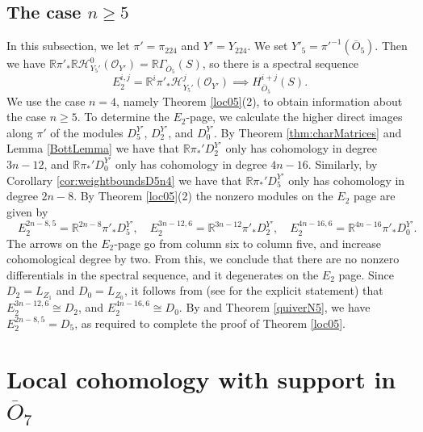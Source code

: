 \documentclass[11pt,reqno]{amsart}
\newcommand{\mc}[1]{\mathcal{#1}}
\newcommand{\ol}[1]{\overline{#1}}
\numberwithin{equation}{section}
\begin{document}
\subsection{The case $n\geq 5$}\label{sec:o5ngeq5} In this subsection, we let $\pi'=\pi_{224}$ and $Y'=Y_{224}$. We set $Y'_5=\pi'^{-1}(\ol{O}_5)$. Then we have $\mathbb{R}\pi'_{\ast}\mathbb{R}\mathscr{H}^0_{Y_5'}(\mc{O}_{Y'})=\mathbb{R}\Gamma_{\ol{O}_5}(S)$, so there is a spectral sequence
\begin{equation}\label{localO5ngeq5}
E_2^{i,j}=\mathbb{R}^i\pi'_{\ast}\mathscr{H}^j_{Y_5'}(\mc{O}_{Y'})\implies H^{i+j}_{\ol{O}_5}(S).
\end{equation}
We use the case $n=4$, namely Theorem \ref{loc05}(2), to obtain information about the case $n\geq 5$. To determine the $E_2$-page, we calculate the higher direct images along $\pi'$ of the modules $D^{Y'}_5$, $D^{Y'}_2$, and $D^{Y'}_0$. By Theorem \ref{thm:charMatrices} and Lemma \ref{BottLemma} we have that $\mathbb{R}\pi_{\ast}'D_2^{Y'}$ only has cohomology in degree $3n-12$, and $\mathbb{R}\pi_{\ast}'D_0^{Y'}$ only has cohomology in degree $4n-16$. Similarly, by Corollary \ref{cor:weightboundsD5n4} we have that $\mathbb{R}\pi_{\ast}'D_5^{Y'}$ only has cohomology in degree $2n-8$. By Theorem \ref{loc05}(2) the nonzero modules on the $E_2$ page are given by
$$
\quad E_2^{2n-8,5}=\mathbb{R}^{2n-8}\pi'_{\ast}D_5^{Y'},\quad E_2^{3n-12,6}=\mathbb{R}^{3n-12}\pi'_{\ast}D_2^{Y'},\quad E_2^{4n-16,6}=\mathbb{R}^{4n-16}\pi'_{\ast}D_0^{Y'}.
$$
The arrows on the $E_2$-page go from column six to column five, and increase cohomological degree by two. From this, we conclude that there are no nonzero differentials in the spectral sequence, and it degenerates on the $E_2$ page. Since $D_2=L_{Z_1}$ and $D_0=L_{Z_0}$, it follows from \cite{raicu2016characters, raicuWeymanLocal} (see \cite[Lemma 3.4]{socledegs} for the explicit statement) that $E_2^{3n-12,6}\cong D_2$, and $E_2^{4n-16,6}\cong D_0$. By \cite[Lemma 3.11]{lHorincz2019categories} and Theorem \ref{quiverN5}, we have $E_2^{2n-8,5}=D_5$, as required to complete the proof of Theorem \ref{loc05}. 










\section{Local cohomology with support in $\ol{O}_7$}\label{sec:O7}
\end{document}
